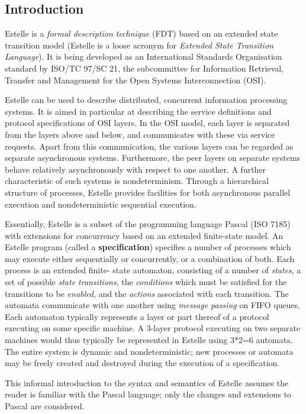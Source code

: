 \subsection[Introduction]{Introduction}
 
Estelle is a {\em formal description technique} (FDT) based on
an extended state transition model (Estelle is a loose
acronym for {\em Extended State Transition Language}). It is
being developed as an International Standards Organisation
standard by ISO/TC 97/SC 21, the subcommittee for
Information Retrieval, Transfer and Management for the Open
Systems Interconnection (OSI).
 
Estelle can be used to describe distributed, concurrent
information processing systems. It is aimed in particular
at describing the service definitions and protocol
specifications of OSI layers. In the OSI model, each layer
is separated from the layers above and below, and
communicates with these via service requests. Apart from
this communication, the various layers can be regarded as
separate asynchronous systems. Furthermore, the peer layers
on separate systems behave relatively asynchronously with
respect to one another. A further characteristic of such
systems is nondeterminism. Through a hierarchical structure
of processes, Estelle provides facilities for both
asynchronous parallel execution and nondeterministic
sequential execution.
 
Essentially, Estelle is a subset of the programming
language Pascal (ISO 7185) with extensions for concurrency
based on an extended finite-state model. An Estelle program
(called a {\bf specification}) specifies a number of processes
which may execute either sequentially or concurrently, or a
combination of both. Each process is an extended finite-
state automaton, consisting of a number of {\em states}, a set of
possible {\em state transitions}, the {\em conditions} which must be
satisfied for the transitions to be {\em enabled}, and the 
{\em actions} associated with each transition. The automata communicate
with one another using {\em message passing} on FIFO queues. Each
automaton typically represents a layer or part thereof of a
protocol executing on some specific machine. A 3-layer
protocol executing on two separate machines would thus
typically be represented in Estelle using 3*2=6 automata.
The entire system is dynamic and nondeterministic; new
processes or automata may be freely created and destroyed
during the execution of a specification.
 
 This informal introduction to the syntax
and semantics of Estelle assumes the reader is familiar
with the Pascal language; only the changes and extensions to
Pascal are considered.

